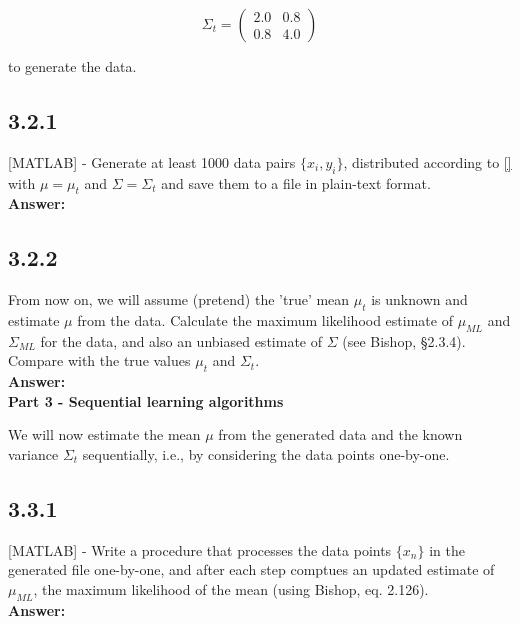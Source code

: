 \documentclass[a4paper]{article}
\begin{document}
\[ \Sigma_t = \left( \begin{array}{cc}
2.0 & 0.8  \\
0.8 & 4.0 \end{array} \right)\] 

to generate the data.


\subsection*{3.2.1}

[MATLAB] - Generate at least 1000 data pairs $\{ x_i, y_i\}$, distributed according to \ref{} with $\mu = \mu_t$ and $\Sigma = \Sigma_t$ and save them to a file in plain-text format.\\

\textbf{Answer:}\\



\subsection*{3.2.2}

From now on, we will assume (pretend) the 'true' mean $\mu_t$ is unknown and estimate $\mu$ from the data. Calculate the maximum likelihood estimate of $\mu_{ML}$ and $\Sigma_{ML}$ for the data, and also an unbiased estimate of $\Sigma$ (see Bishop, §2.3.4). Compare with the true values $\mu_t$ and $\Sigma_t$.\\

\textbf{Answer:}\\



\textbf{Part 3 - Sequential learning algorithms}

We will now estimate the mean $\mu$ from the generated data and the known variance $\Sigma_t$ sequentially, i.e., by considering the data points one-by-one.

\subsection*{3.3.1}

[MATLAB] - Write a procedure that processes the data points $\{ x_n \}$ in the generated file one-by-one, and after each step comptues an updated estimate of $\mu_{ML}$, the maximum likelihood of the mean (using Bishop, eq. 2.126).\\


\textbf{Answer:}\\
\end{document}
